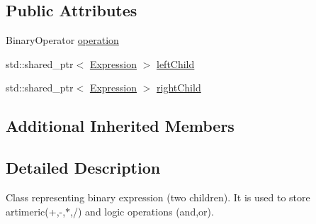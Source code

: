 \subsection*{Public Attributes}
\begin{DoxyCompactItemize}
\item 
Binary\+Operator \hyperlink{classrafe_1_1_binary_expression_a7180ae7c20f907d52a0f9c8521d5c111}{operation}
\item 
std\+::shared\+\_\+ptr$<$ \hyperlink{classrafe_1_1_expression}{Expression} $>$ \hyperlink{classrafe_1_1_binary_expression_a1c428205f0d4d597a6307e7cab39ee21}{left\+Child}
\item 
std\+::shared\+\_\+ptr$<$ \hyperlink{classrafe_1_1_expression}{Expression} $>$ \hyperlink{classrafe_1_1_binary_expression_ad915f6160c53ad08803e30db1ffc8e1c}{right\+Child}
\end{DoxyCompactItemize}
\subsection*{Additional Inherited Members}


\subsection{Detailed Description}
Class representing binary expression (two children). It is used to store artimeric(+,-\/,$\ast$,/) and logic operations (and,or). 

